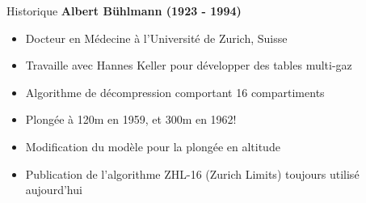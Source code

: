 \begin{frame}{Historique}  
	\textbf{Albert Bühlmann (1923 - 1994)}
	\begin{itemize}
		\item Docteur en Médecine à l'Université de Zurich, Suisse
		\item Travaille avec Hannes Keller pour développer des tables multi-gaz
		\item Algorithme de décompression comportant 16 compartiments
		\item Plongée à 120m en 1959, et 300m en 1962!
		\item Modification du modèle pour la plongée en altitude
		\item Publication de l'algorithme ZHL-16 (Zurich Limits) toujours utilisé aujourd'hui
	\end{itemize}
\end{frame}